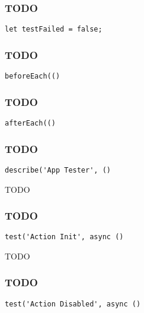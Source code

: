 \documentclass[a4paper]{article}
\begin{document}
\hypertarget{toc706}{}
\subsubsection{TODO}

\begin{lstlisting}
let testFailed = false;
\end{lstlisting}

\hypertarget{toc707}{}
\subsubsection{TODO}

\begin{lstlisting}
beforeEach(()
\end{lstlisting}

\hypertarget{toc708}{}
\subsubsection{TODO}

\begin{lstlisting}
afterEach(()
\end{lstlisting}

\hypertarget{toc709}{}
\subsubsection{TODO}

\begin{lstlisting}
describe('App Tester', ()
\end{lstlisting}

TODO

\hypertarget{toc710}{}
\subsubsection{TODO}

\begin{lstlisting}
test('Action Init', async ()
\end{lstlisting}

TODO

\hypertarget{toc711}{}
\subsubsection{TODO}

\begin{lstlisting}
test('Action Disabled', async ()
\end{lstlisting}
\end{document}
